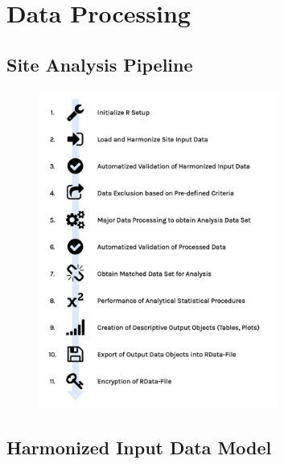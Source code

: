 \documentclass[
  letterpaper,
  DIV=11,
  numbers=noendperiod]{scrreprt}
\begin{document}
\hypertarget{data-processing}{%
\chapter{Data Processing}\label{data-processing}}

\hfill\break

\hypertarget{site-analysis-pipeline}{%
\section{Site Analysis Pipeline}\label{site-analysis-pipeline}}

\begin{figure}

{\centering \includegraphics[width=0.7\textwidth,height=\textheight]{Images/AnalysisPipeline.png}

}

\end{figure}

\hypertarget{harmonized-input-data-model}{%
\section{Harmonized Input Data
Model}\label{harmonized-input-data-model}}
\end{document}
